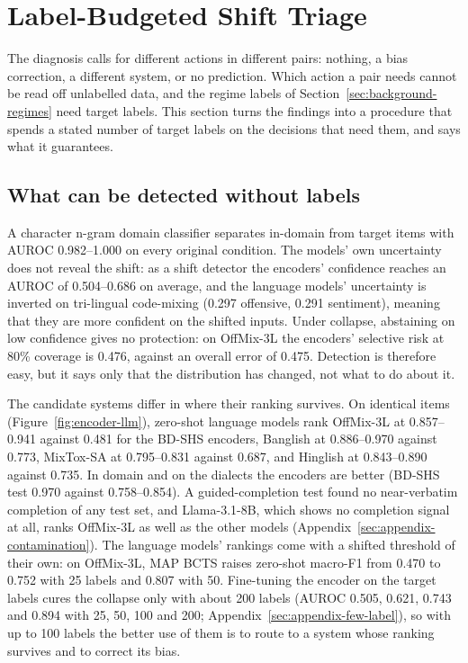 \section{Label-Budgeted Shift Triage}
\label{sec:shift-triage}

The diagnosis calls for different actions in different pairs: nothing, a bias correction, a different system, or no
prediction. Which action a pair needs cannot be read off unlabelled data, and the regime labels of
Section~\ref{sec:background-regimes} need target labels. This section turns the findings into a procedure that
spends a stated number of target labels on the decisions that need them, and says what it guarantees.

\subsection{What can be detected without labels}
\label{sec:triage-detection}

A character n-gram domain classifier separates in-domain from target items with AUROC 0.982--1.000 on every original
condition. The models' own uncertainty does not reveal the shift: as a shift detector the encoders' confidence reaches
an AUROC of 0.504--0.686 on average, and the language models' uncertainty is inverted on tri-lingual code-mixing (0.297
offensive, 0.291 sentiment), meaning that they are more confident on the shifted inputs. Under collapse, abstaining on
low confidence gives no protection: on OffMix-3L the encoders' selective risk at 80\% coverage is 0.476, against an
overall error of 0.475. Detection is therefore easy, but it says only that the distribution has changed, not what to
do about it.

The candidate systems differ in where their ranking survives. On identical items (Figure~\ref{fig:encoder-llm}),
zero-shot language models rank OffMix-3L at 0.857--0.941 against 0.481 for the BD-SHS encoders, Banglish at
0.886--0.970 against 0.773, MixTox-SA at 0.795--0.831 against 0.687, and Hinglish at 0.843--0.890 against 0.735. In
domain and on the dialects the encoders are better (BD-SHS test 0.970 against 0.758--0.854). A guided-completion test
found no near-verbatim completion of any test set, and Llama-3.1-8B, which shows no completion signal at all, ranks
OffMix-3L as well as the other models (Appendix~\ref{sec:appendix-contamination}). The language models' rankings come
with a shifted threshold of their own: on OffMix-3L, MAP BCTS raises zero-shot macro-F1 from 0.470 to 0.752 with 25
labels and 0.807 with 50. Fine-tuning the encoder on the target labels cures the collapse only with about 200 labels
(AUROC 0.505, 0.621, 0.743 and 0.894 with 25, 50, 100 and 200; Appendix~\ref{sec:appendix-few-label}), so with up to
100 labels the better use of them is to route to a system whose ranking survives and to correct its bias.


